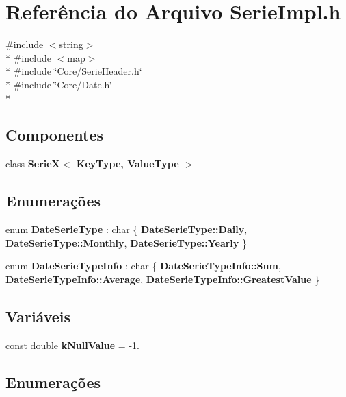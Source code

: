 \section{Referência do Arquivo Serie\+Impl.\+h}
\label{_serie_impl_8h}
{\ttfamily \#include $<$string$>$}\\*
{\ttfamily \#include $<$map$>$}\\*
{\ttfamily \#include \char`\"{}Core/\+Serie\+Header.\+h\char`\"{}}\\*
{\ttfamily \#include \char`\"{}Core/\+Date.\+h\char`\"{}}\\*
\subsection*{Componentes}
\begin{DoxyCompactItemize}
\item 
class {\bf Serie\+X$<$ Key\+Type, Value\+Type $>$}
\end{DoxyCompactItemize}
\subsection*{Enumerações}
\begin{DoxyCompactItemize}
\item 
enum {\bf Date\+Serie\+Type} \+: char \{ {\bf Date\+Serie\+Type\+::\+Daily}, 
{\bf Date\+Serie\+Type\+::\+Monthly}, 
{\bf Date\+Serie\+Type\+::\+Yearly}
 \}
\item 
enum {\bf Date\+Serie\+Type\+Info} \+: char \{ {\bf Date\+Serie\+Type\+Info\+::\+Sum}, 
{\bf Date\+Serie\+Type\+Info\+::\+Average}, 
{\bf Date\+Serie\+Type\+Info\+::\+Greatest\+Value}
 \}
\end{DoxyCompactItemize}
\subsection*{Variáveis}
\begin{DoxyCompactItemize}
\item 
const double {\bf k\+Null\+Value} = -\/1.
\end{DoxyCompactItemize}


\subsection{Enumerações}
